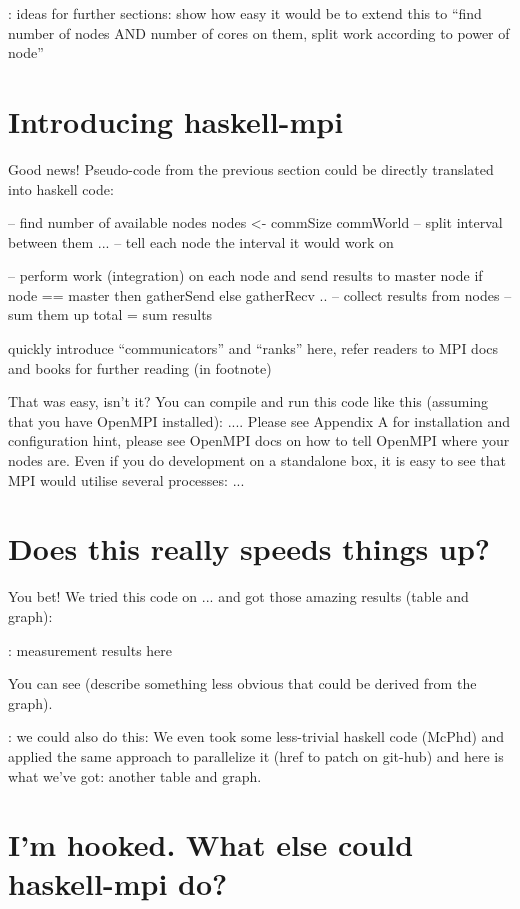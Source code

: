 \documentclass{tmr}
\begin{document}
\ToDo: ideas for further sections: show how easy it would be to extend this to ``find number of nodes AND number of cores on them, split work according to power of node''


\section{Introducing haskell-mpi}

Good news! Pseudo-code from the previous section could be directly translated into haskell code:

\begin{haskell}
-- find number of available nodes
nodes <- commSize commWorld
-- split interval between them
...
-- tell each node the interval it would work on

-- perform work (integration) on each node and send results to master node
if node == master then gatherSend else gatherRecv ..
-- collect results from nodes 
-- sum them up
total = sum results
\end{haskell}


\ToDo quickly introduce ``communicators'' and ``ranks'' here, refer readers to MPI docs and books for further reading (in footnote)

That was easy, isn't it? You can compile and run this code like this (assuming that you have OpenMPI installed): .... Please see Appendix A for installation and configuration hint, please see OpenMPI docs on how to tell OpenMPI where your nodes are. Even if you do development on a standalone box, it is easy to see that MPI would utilise several processes: ...

\section{Does this really speeds things up?}

You bet! We tried this code on ... and got those amazing results (table and graph):

\ToDo: measurement results here

You can see (describe something less obvious that could be derived from the graph).

\ToDo: we could also do this: We even took some less-trivial haskell
code (McPhd) and applied the same approach to parallelize it (href to
patch on git-hub) and here is what we've got: another table and graph.

\section{I'm hooked. What else could haskell-mpi do?}
\end{document}
